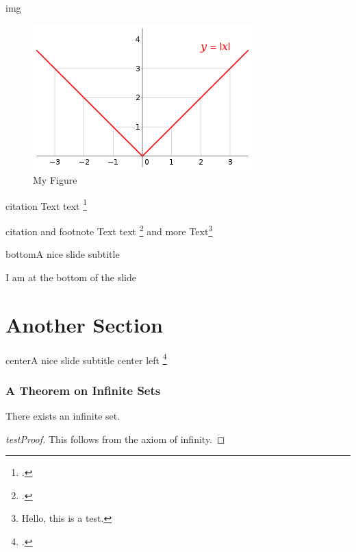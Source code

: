 \begin{frame}{img}\vspace{5pt}
\begin{figure}
    \centering
    \includegraphics[scale=0.7]{img/320px-Absolute_value.svg.png}
    \caption{My Figure}
    \label{fig:my_label}
\end{figure}
\end{frame}

\begin{frame}[t]{citation}\vspace{5pt}
Text text \footcite{attention}
\end{frame}
 
\begin{frame}[t]{citation and footnote}
Text text \footcite{goodfellow} and more Text\footnote{Hello, this is a test.}
\end{frame}
 
\begin{frame}[b]{bottom}{A nice slide subtitle}\vspace{5pt}
\begin{center}
I am at the bottom of the slide
\end{center}
\end{frame}
 
\section{Another Section}
 
\begin{frame}{center}{A nice slide subtitle}\vspace{5pt}
center left \footcite{goldberg}
\end{frame}

\begin{frame}
\frametitle{A Theorem on Infinite Sets}
\begin{theorem}
There exists an infinite set.
\end{theorem}
\begin{proof}[testProof]
This follows from the axiom of infinity.
\end{proof}
\end{frame}
 
